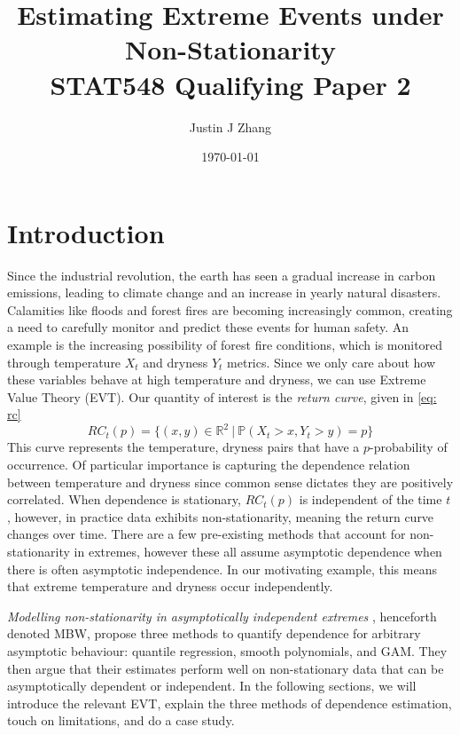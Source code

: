 \documentclass[12pt]{article}
\title{Estimating Extreme Events under Non-Stationarity \\
  \large STAT548 Qualifying Paper 2} %
\author{Justin J Zhang} %
\date{\today} %
\begin{document}
\maketitle

\newpage

\section{Introduction}
Since the industrial revolution, the earth has seen a gradual increase in carbon emissions, leading to climate change and an increase in yearly natural disasters.
Calamities like floods and forest fires are becoming increasingly common, creating a need to carefully monitor and predict these events for human safety.
An example is the increasing possibility of forest fire conditions, which is monitored through temperature $X_t$ and dryness $Y_t$ metrics.
Since we only care about how these variables behave at high temperature and dryness, we can use Extreme Value Theory (EVT). 
Our quantity of interest is the \textit{return curve}, given in \cref{eq: rc}
\begin{equation} \label{eq: rc}
  RC_t(p) = \{ (x, y) \in \mathbb{R}^2 \ |\  \mathbb{P}(X_t > x, Y_t > y) = p \}
\end{equation}
This curve represents the temperature, dryness pairs that have a $p$-probability of occurrence. 
Of particular importance is capturing the dependence relation between temperature and dryness since common sense dictates they are positively correlated.
When dependence is stationary, $RC_t(p)$ is independent of the time $t$, however, in practice data exhibits non-stationarity, meaning the return curve changes over time.
There are a few pre-existing methods that account for non-stationarity in extremes, however these all assume asymptotic dependence when there is often asymptotic independence. In our motivating example, this means that extreme temperature and dryness occur independently.

\textit{Modelling non-stationarity in asymptotically independent extremes} \citep{Murphy-Barltrop2024}, henceforth denoted MBW, propose 
three methods to quantify dependence for arbitrary asymptotic behaviour: quantile regression, smooth polynomials, and GAM. 
They then argue that their estimates perform well on non-stationary data that can be asymptotically dependent or independent.
In the following sections, we will introduce the relevant
EVT, explain the three methods of dependence estimation, touch on limitations, and do a case study.
\end{document}
